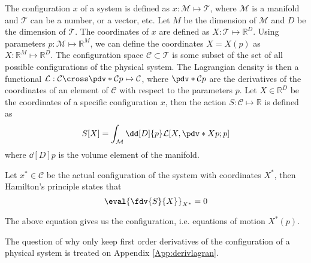 \documentclass{myclass}
\begin{document}
The configuration \(x \) of a system is defined as \( x: \mathcal{M} \mapsto \mathcal{T}\), where \( \mathcal{M}\) is a manifold and \(\mathcal{T} \) can be a number, or a vector, etc. Let \(M \) be the dimension of \(\mathcal{M} \) and \(D\) be the dimension of \(\mathcal{T}\). The coordinates of \(x\) are defined as \(X: \mathcal{T}\mapsto \mathbb{R}^{D} \). Using parameters \(p: \mathcal{M}\mapsto \mathbb{R}^{M} \), we can define the coordinates \(X = X(p) \) as \(X:\mathbb{R}^{M} \mapsto \mathbb{R}^{D} \). The configuration space \( \mathcal{C} \subset \mathcal{T}\) is some subset of the set of all possible configurations of the physical system. The Lagrangian density is then a functional \(\mathcal{L}:\mathcal{C}\cross \pdv*{\mathcal{C}}{p} \mapsto \mathcal{C} \), where \( \pdv*{\mathcal{C}}{p} \) are the derivatives of the coordinates of an element of \(\mathcal{C} \) with respect to the parameters \(p \). Let \(X \in \mathbb{R}^{D} \) be the coordinates of a specific configuration \(x\), then the action \( S:\mathcal{C} \mapsto \mathbb{R}\) is defined as
\[S[X] = \int_{\mathcal{M}} \dd[D]{p} \mathcal{L}[X, \pdv*{X}{p} ;p] \]
where \(\dd[D]{p} \) is the volume element of the manifold.\par
Let \(x^* \in \mathcal{C} \) be the actual configuration of the system with coordinates \(X^* \), then Hamilton's principle states that
\[\eval{\fdv{S}{X}}_{X^*} =0 \]\par
The above equation gives us the configuration, i.e. equations of motion \(X^*(p) \).\par
The question of why only keep first order derivatives of the configuration of a physical system is treated on Appendix \ref{App:derivlagran}.
\end{document}

